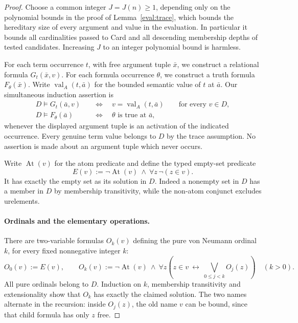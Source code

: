 \begin{proof}
Choose a common integer \(J=J(n)\ge1\), depending only on the polynomial
bounds in the proof of Lemma~\ref{eval:trace}, which bounds the hereditary
size of every argument and value in the evaluation.  In particular it
bounds all cardinalities passed to Card and all descending membership
depths of tested candidates.  Increasing \(J\) to an integer polynomial
bound is harmless.

For each term occurrence \(t\), with free argument tuple \(\bar x\),
we construct a relational formula \(G_t(\bar x,v)\).
For each formula occurrence \(\theta\), we construct a truth formula
\(F_\theta(\bar x)\).  Write \(\operatorname{val}_A(t,\bar a)\) for the
bounded semantic value of \(t\) at \(\bar a\).
Our simultaneous induction assertion is
\begin{equation}\label{eval:graph-invariant}
 \begin{split}
 D\models G_t(\bar a,v)
   &\quad\Longleftrightarrow\quad
       v=\operatorname{val}_A(t,\bar a)
       \qquad\text{for every }v\in D,\\
 D\models F_\theta(\bar a)
   &\quad\Longleftrightarrow\quad
       \theta\text{ is true at }\bar a,
 \end{split}
\end{equation}
whenever the displayed argument tuple is an activation of the indicated
occurrence.  Every genuine term value belongs to \(D\) by the trace
assumption.  No assertion is made about an argument tuple which never
occurs.

Write \(\operatorname{At}(v)\) for the atom predicate and define the
typed empty-set predicate
\[
 E(v):=\neg\operatorname{At}(v)\ \land\
                    \forall z\,\neg(z\in v).
\]
It has exactly the empty set as its solution in \(D\).  Indeed a nonempty
set in \(D\) has a member in \(D\) by membership transitivity, while the
non-atom conjunct excludes urelements.

\paragraph{Ordinals and the elementary operations.}
There are two-variable formulas \(O_k(v)\) defining the pure von Neumann
ordinal \(k\), for every fixed nonnegative integer \(k\):
\[
 O_0(v):=E(v),\qquad
 O_k(v):=\neg\operatorname{At}(v)\ \land\
       \forall z\left(z\in v\ \longleftrightarrow\
                         \bigvee_{0\le j<k}O_j(z)\right)\quad(k>0).
\]
All pure ordinals belong to \(D\).  Induction on \(k\), membership
transitivity and extensionality show that \(O_k\) has exactly the
claimed solution.  The two names alternate in the recursion:
inside \(O_j(z)\), the old name \(v\) can be bound, since that child
formula has only \(z\) free.


\end{proof}
